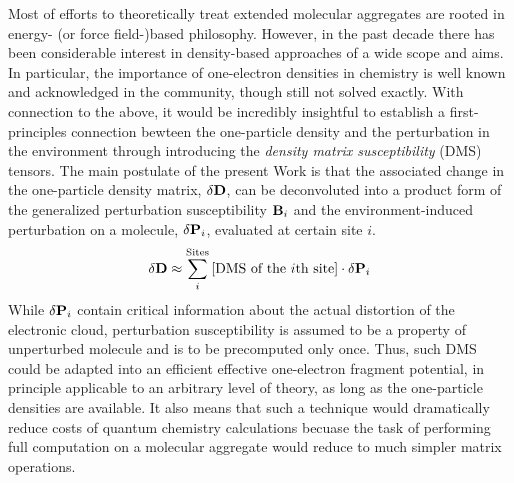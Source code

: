 \documentclass[aip,amsmath,amssymb,reprint,floatfix]{revtex4-1}
\newcommand{\BM}[1]{\bm{#1}}
\begin{document}
Most of efforts to theoretically treat extended molecular aggregates are rooted in 
energy\hyp{} (or force field\hyp{})based philosophy. However,
in the past decade there has been considerable interest in density\hyp{}based approaches
of a wide scope and aims.\cite{Piquemal.Cisneros.Reinhardt.Gresh.Darden.JCP.2006,
Mandado.Hermida-Ramon.JCTC.2011,
Sun.Chan.ACR.2016,
Hedegard.Reiher.JCTC.2016} 
In particular, the importance of
one\hyp{}electron densities in chemistry is well known and acknowledged in the community,
though still not solved exactly.\cite{Holas.March.PhysRevA.1991}
With connection to the above, it would be incredibly insightful 
to establish a first\hyp{}principles connection bewteen the one\hyp{}particle
density and the perturbation in the environment through introducing the
\emph{density matrix susceptibility} (DMS) tensors. %
The main postulate of the present Work is that the associated change 
in the one\hyp{}particle density matrix, $\delta {\bf D}$, can be
deconvoluted into a product form of the generalized perturbation susceptibility ${\bf B}_i$
and the environment\hyp{}induced perturbation on a molecule, $\delta {\bf P}_i$,
evaluated at certain site $i$.
%
\begin{equation*} \label{e:initial-model}
 \delta {\bf D} \approx \sum_i^{\text{Sites}} \text{[DMS of the $i$th site]} 
  \cdot  \delta {\bf P}_i
\end{equation*}
%
While $\delta {\bf P}_i$ contain critical information 
about the actual distortion of the electronic cloud,
perturbation susceptibility is assumed to be a property of unperturbed 
molecule and is to be precomputed only once. 
Thus, such DMS could be adapted into an efficient effective 
one\hyp{}electron fragment potential, in principle applicable to an arbitrary
level of theory, as long as the one\hyp{}particle densities are available.
It also means that such a technique would dramatically reduce costs of quantum chemistry calculations
becuase the task of performing full computation on a molecular aggregate
would reduce to much simpler matrix operations.
%
\end{document}
